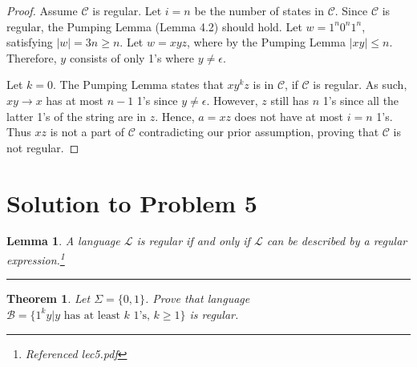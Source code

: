 \documentclass[11pt]{report}
\newcounter{problem}
\theoremstyle{definition}
\theoremstyle{plain}
\newtheorem{lemma}{Lemma}[problem]
\theoremstyle{plain}
\newtheorem{theorem*}{Theorem}
\begin{document}
\begin{proof}
Assume $\mathcal{C}$ is regular. Let $i=n$ be the number of states in $\mathcal{C}$. 
Since $\mathcal{C}$ is regular, the Pumping Lemma (Lemma 4.2) should hold.
Let $w=1^{n}0^{n}1^{n}$, satisfying $|w|=3n \geq n$. 
Let $w=xyz$, where by the Pumping Lemma $|xy| \leq n$. 
Therefore, $y$ consists of only 1's where $y \neq \epsilon$.\newline

\noindent Let $k=0$. The Pumping Lemma states that $xy^{k}z$ is in $\mathcal{C}$, if $\mathcal{C}$ is regular.
As such, $xy \rightarrow x$ has at most $n-1$ 1's since $y \neq \epsilon$.
However, $z$ still has $n$ 1's since all the latter 1's of the string are in $z$.
Hence, $a = xz$ does not have at most $i = n$ 1's.
Thus $xz$ is not a part of $\mathcal{C}$ contradicting our prior assumption,
proving that $\mathcal{C}$ is not regular.
\end{proof}

\pagebreak

\section*{Solution to Problem 5}

\begin{lemma}
A language $\mathcal{L}$ is regular if and only if $\mathcal{L}$ can be described by a regular expression.\footnote{Referenced lec5.pdf}
\end{lemma}

\hrule

\begin{theorem*}
Let $\Sigma=\{0,1\}$. Prove that language 
$\mathcal{B}=\{1^{k}y|y \text{ has at least } k \text{ 1's, } k \geq 1 \}$ is regular.
\end{theorem*}
\end{document}
